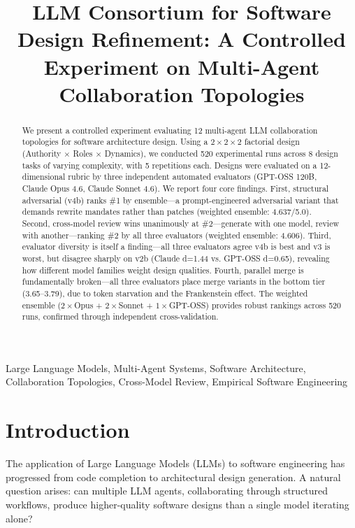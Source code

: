 \documentclass[conference]{IEEEtran}
\title{LLM Consortium for Software Design Refinement: A Controlled Experiment on Multi-Agent Collaboration Topologies}
\author{
\IEEEauthorblockN{Nagarjuna Kanamarlapudi}
\IEEEauthorblockA{Fremont, USA \\ nagarjuna.kanamarlapudi@gmail.com}
\and
\IEEEauthorblockN{Praveen K}
\IEEEauthorblockA{Fremont, USA \\ kpraveen0122@outlook.com}
}
\begin{document}
\maketitle

\begin{abstract}
We present a controlled experiment evaluating 12 multi-agent LLM collaboration topologies for software architecture design. Using a $2\times2\times2$ factorial design (Authority $\times$ Roles $\times$ Dynamics), we conducted 520 experimental runs across 8 design tasks of varying complexity, with 5 repetitions each. Designs were evaluated on a 12-dimensional rubric by three independent automated evaluators (GPT-OSS 120B, Claude Opus 4.6, Claude Sonnet 4.6). We report four core findings. First, structural adversarial (v4b) ranks \#1 by ensemble---a prompt-engineered adversarial variant that demands rewrite mandates rather than patches (weighted ensemble: 4.637/5.0). Second, cross-model review wins unanimously at \#2---generate with one model, review with another---ranking \#2 by all three evaluators (weighted ensemble: 4.606). Third, evaluator diversity is itself a finding---all three evaluators agree v4b is best and v3 is worst, but disagree sharply on v2b (Claude d=1.44 vs. GPT-OSS d=0.65), revealing how different model families weight design qualities. Fourth, parallel merge is fundamentally broken---all three evaluators place merge variants in the bottom tier (3.65--3.79), due to token starvation and the Frankenstein effect. The weighted ensemble ($2\times$Opus + $2\times$Sonnet + $1\times$GPT-OSS) provides robust rankings across 520 runs, confirmed through independent cross-validation.
\end{abstract}

\begin{IEEEkeywords}
Large Language Models, Multi-Agent Systems, Software Architecture, Collaboration Topologies, Cross-Model Review, Empirical Software Engineering
\end{IEEEkeywords}
\section{Introduction}

The application of Large Language Models (LLMs) to software engineering has progressed from code completion to architectural design generation. A natural question arises: can multiple LLM agents, collaborating through structured workflows, produce higher-quality software designs than a single model iterating alone?
\end{document}
